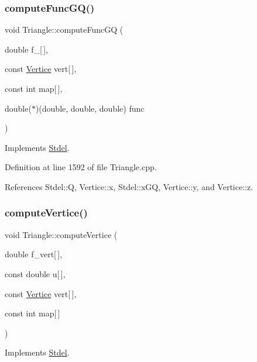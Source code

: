 \subsubsection{\texorpdfstring{compute\+Func\+G\+Q()}{computeFuncGQ()}}
{\footnotesize\ttfamily void Triangle\+::compute\+Func\+GQ (\begin{DoxyParamCaption}\item[{double}]{f\+\_\+\mbox{[}$\,$\mbox{]},  }\item[{const \hyperlink{structVertice}{Vertice}}]{vert\mbox{[}$\,$\mbox{]},  }\item[{const int}]{map\mbox{[}$\,$\mbox{]},  }\item[{double($\ast$)(double, double, double)}]{func }\end{DoxyParamCaption})\hspace{0.3cm}{\ttfamily [virtual]}}



Implements \hyperlink{classStdel_a59195ad1ce9b90ef83fd935698dc3305}{Stdel}.



Definition at line 1592 of file Triangle.\+cpp.



References Stdel\+::Q, Vertice\+::x, Stdel\+::x\+GQ, Vertice\+::y, and Vertice\+::z.

\mbox{\label{classTriangle_ac75851696ddabecfc48a784cf9b3ba8a}} 
\subsubsection{\texorpdfstring{compute\+Vertice()}{computeVertice()}}
{\footnotesize\ttfamily void Triangle\+::compute\+Vertice (\begin{DoxyParamCaption}\item[{double}]{f\+\_\+vert\mbox{[}$\,$\mbox{]},  }\item[{const double}]{u\mbox{[}$\,$\mbox{]},  }\item[{const \hyperlink{structVertice}{Vertice}}]{vert\mbox{[}$\,$\mbox{]},  }\item[{const int}]{map\mbox{[}$\,$\mbox{]} }\end{DoxyParamCaption})\hspace{0.3cm}{\ttfamily [virtual]}}



Implements \hyperlink{classStdel_a74eed41f670878759c84e2014b4a2cd5}{Stdel}.




